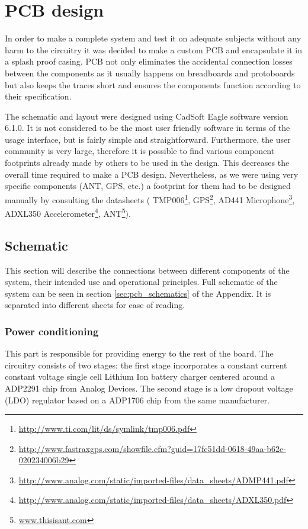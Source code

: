 \chapter{PCB design}
In order to make a complete system and test it on adequate subjects without any harm to the circuitry it was decided to make a custom PCB and encapsulate it in a splash proof casing. PCB not only eliminates the accidental connection losses between the components as it usually happens on breadboards and protoboards but also keeps the traces short and ensures the components function according to their specification.
 
The schematic and layout were designed using CadSoft Eagle software version 6.1.0. It is not considered to be the most user friendly software in terms of the usage interface, but is fairly simple and straightforward. Furthermore, the user community is very large, therefore it is possible to find various component footprints already made by others to be used in the design. This decreases the overall time required to make a PCB design. Nevertheless, as we were using very specific components  (ANT, GPS, etc.) a footprint for them had to be designed manually by consulting the datasheets ( TMP006\footnote{\url{http://www.ti.com/lit/ds/symlink/tmp006.pdf}}, GPS\footnote{\url{http://www.fastraxgps.com/showfile.cfm?guid=17fc51dd-0618-49aa-b62e-020234006b29}},
AD441 Microphone\footnote{\url{http://www.analog.com/static/imported-files/data_sheets/ADMP441.pdf}},
ADXL350 Accelerometer\footnote{\url{http://www.analog.com/static/imported-files/data_sheets/ADXL350.pdf}},
ANT\footnote{\href{http://www.thisisant.com/assets/resources/Datasheets/D00001266_AP2_RF_Transceiver_Module_Datasheet_Rev1.8.pdf}{www.thisisant.com}}).


\section{Schematic}
This section will describe the connections between different components of the system, their intended use and operational principles. Full schematic of the system can be seen in section \ref{sec:pcb_schematics} of the Appendix. It is separated into different sheets for ease of reading.

\subsection{Power conditioning}
This part is responsible for providing energy to the rest of the board. The circuitry consists of two stages: the first stage incorporates a constant current constant voltage single cell Lithium Ion battery charger centered around a ADP2291 chip from Analog Devices. The second stage is a low dropout voltage (LDO) regulator based on a ADP1706 chip from the same manufacturer.



